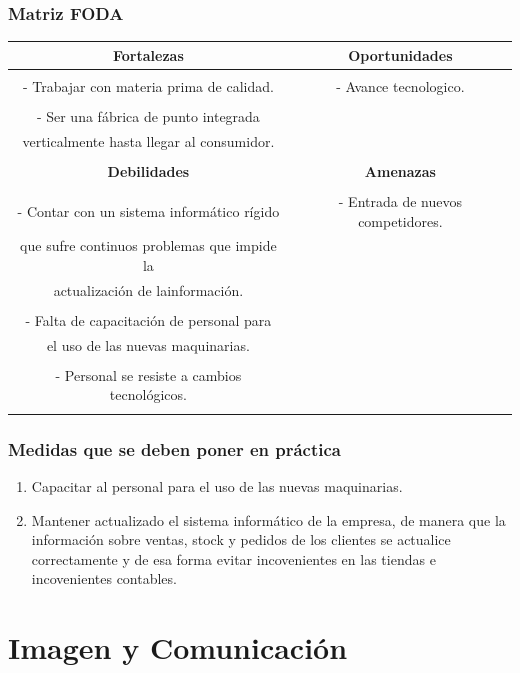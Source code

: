 \documentclass[a4paper,10pt,titlepage]{article}
\begin{document}
\subsubsection{Matriz FODA}
  \begin{tabular}{|c|c|}
    \hline 
      \textbf{Fortalezas} & \textbf{Oportunidades} \\ \hline
& \\
- Trabajar con materia prima de calidad. 
& - Avance tecnologico.\\
&\\
- Ser una f\'abrica de punto integrada & \\verticalmente hasta llegar al consumidor. &\\ &\\

\hline 
    \textbf{Debilidades} & \textbf{Amenazas} \\
\hline     
&\\
- Contar con un sistema inform\'atico r\'igido& - Entrada de nuevos competidores. \\que sufre continuos problemas que impide la &\\ actualizaci\'on de lainformaci\'on. &\\
&\\
- Falta de capacitaci\'on de personal para &\\el uso de las nuevas maquinarias. &\\
&\\
- Personal se resiste a cambios tecnol\'ogicos. &\\&\\ 
 \hline    
  \end{tabular}

  
\subsubsection{Medidas que se deben poner en pr\'actica}
 \begin{enumerate}
 \item Capacitar al personal para el uso de las nuevas maquinarias.
 \item Mantener actualizado el sistema inform\'atico de la empresa, de manera que la informaci\'on sobre ventas, stock y pedidos de los clientes se actualice correctamente y de esa forma evitar incovenientes en las tiendas e incovenientes contables.
\end{enumerate} 

\section{Imagen y Comunicaci\'on}
\end{document}
